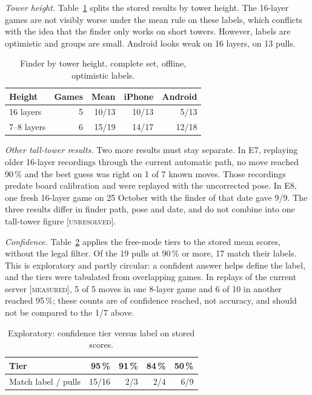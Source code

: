 \documentclass[conference,10pt]{IEEEtran}
\newcommand{\evM}{\textsc{[measured]}}
\newcommand{\evU}{\textsc{[unresolved]}}
\begin{document}
\emph{Tower height.} Table~\ref{tab:height} splits the stored results by tower height. The 16-layer games are not visibly worse under the mean rule on these labels, which conflicts with the idea that the finder only works on short towers. However, labels are optimistic and groups are small. Android looks weak on 16 layers, on 13 pulls.

\begin{table}[!t]
\caption{Finder by tower height, complete set, offline, optimistic labels.}\label{tab:height}
\centering\footnotesize
\begin{tabular}{@{}lrrrr@{}}
\toprule
Height & Games & Mean & iPhone & Android \\
\midrule
16 layers & 5 & 10/13 & 10/13 & 5/13 \\
7--8 layers & 6 & 15/19 & 14/17 & 12/18 \\
\bottomrule
\end{tabular}
\end{table}

\emph{Other tall-tower results.} Two more results must stay separate. In E7, replaying older 16-layer recordings through the current automatic path, no move reached 90\,\% and the best guess was right on 1 of 7 known moves. Those recordings predate board calibration and were replayed with the uncorrected pose. In E8, one fresh 16-layer game on 25 October with the finder of that date gave 9/9. The three results differ in finder path, pose and date, and do not combine into one tall-tower figure \evU.

\emph{Confidence.} Table~\ref{tab:tiers} applies the free-mode tiers to the stored mean scores, without the legal filter. Of the 19 pulls at 90\,\% or more, 17 match their labels. This is exploratory and partly circular: a confident answer helps define the label, and the tiers were tabulated from overlapping games. In replays of the current server \evM, 5 of 5 moves in one 8-layer game and 6 of 10 in another reached 95\,\%; these counts are of confidence reached, not accuracy, and should not be compared to the 1/7 above.

\begin{table}[!t]
\caption{Exploratory: confidence tier versus label on stored scores.}\label{tab:tiers}
\centering\footnotesize
\begin{tabular}{@{}lrrrr@{}}
\toprule
Tier & 95\,\% & 91\,\% & 84\,\% & 50\,\% \\
\midrule
Match label / pulls & 15/16 & 2/3 & 2/4 & 6/9 \\
\bottomrule
\end{tabular}
\end{table}
\end{document}
